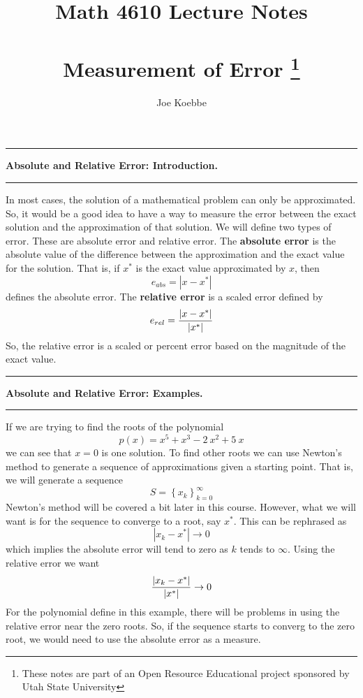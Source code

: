 \documentclass[10pt,fleqn]{article}
\title{Math 4610 Lecture Notes \\
            \ \\
      Measurement of Error
  \footnote{These notes are part of an Open Resource Educational project
            sponsored by Utah State University}}
\author{Joe Koebbe}
\begin{document}
\maketitle
\newpage
\vskip0.1in\hrule\vskip0.1in
\noindent
{\bf Absolute and Relative Error: Introduction.} 
\vskip0.1in\hrule\vskip0.1in
\noindent
In most cases, the solution of a mathematical problem can only be approximated.
So, it would be a good idea to have a way to measure the error between the exact
solution and the approximation of that solution. We will define two types of
error. These are absolute error and relative error. The {\bf absolute error} is
the absolute value of the difference between the approximation and the exact
value for the solution. That is, if $x^*$ is the exact value approximated by
$x$, then
$$ e_{abs} = | x - x^{*} | $$
defines the absolute error. The {\bf relative error} is a scaled error defined
by
$$ e_{rel} = {{| x - x^{*} |}\over{|x^*|}} $$
So, the relative error is a scaled or percent error based on the magnitude of
the exact value.

\vskip0.1in\hrule\vskip0.1in
\noindent
{\bf Absolute and Relative Error: Examples.} 
\vskip0.1in\hrule\vskip0.1in
\noindent
If we are trying to find the roots of the polynomial
$$
  p(x) = x^5 + x^3 - 2\ x^2 + 5\ x
$$
we can see that $x=0$ is one solution. To find other roots we can use Newton's
method to generate a sequence of approximations given a starting point. That is,
we will generate a sequence
$$
   S = \left\lbrace x_k \right\rbrace_{k=0}^{\infty}
$$
Newton's method will be covered a bit later in this course. However, what we
will want is for the sequence to converge to a root, say $x^*$. This can be
rephrased as
$$ | x_k - x^* | \rightarrow 0 $$
which implies the absolute error will tend to zero as $k$ tends to $\infty$.
Using the relative error we want
$$ {{ | x_k - x^* | }\over{ | x^* | }} \rightarrow 0 $$
For the polynomial define in this example, there will be problems in using the
relative error near the zero roots. So, if the sequence starts to converg to the
zero root, we would need to use the absolute error as a measure.
\end{document}
